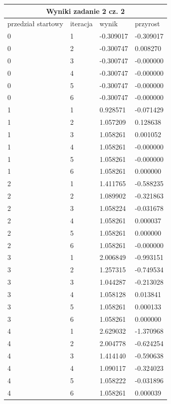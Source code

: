 \documentclass[a4paper, 11pt]{article}
\begin{document}
\begin{table}[H]
\centering
\label{my-label}
\begin{tabular}{|l|l|l|l|}
\hline
\multicolumn{4}{|c|}{\textbf{Wyniki zadanie 2 cz. 2}} \\ \hline
\multicolumn{1}{|c|}{przedział startowy} & iteracja & wynik & przyrost \\ \hline
0 & 1 & -0.309017 & -0.309017 \\ \hline
0 & 2 & -0.300747 & 0.008270 \\ \hline
0 & 3 & -0.300747 & -0.000000 \\ \hline
0 & 4 & -0.300747 & -0.000000 \\ \hline
0 & 5 & -0.300747 & -0.000000 \\ \hline
0 & 6 & -0.300747 & -0.000000 \\ \hline
1 & 1 & 0.928571 & -0.071429 \\ \hline
1 & 2 & 1.057209 & 0.128638 \\ \hline
1 & 3 & 1.058261 & 0.001052 \\ \hline
1 & 4 & 1.058261 & -0.000000 \\ \hline
1 & 5 & 1.058261 & -0.000000 \\ \hline
1 & 6 & 1.058261 & 0.000000 \\ \hline
2 & 1 & 1.411765 & -0.588235 \\ \hline
2 & 2 & 1.089902 & -0.321863 \\ \hline
2 & 3 & 1.058224 & -0.031678 \\ \hline
2 & 4 & 1.058261 & 0.000037 \\ \hline
2 & 5 & 1.058261 & 0.000000 \\ \hline
2 & 6 & 1.058261 & -0.000000 \\ \hline
3 & 1 & 2.006849 & -0.993151 \\ \hline
3 & 2 & 1.257315 & -0.749534 \\ \hline
3 & 3 & 1.044287 & -0.213028 \\ \hline
3 & 4 & 1.058128 & 0.013841 \\ \hline
3 & 5 & 1.058261 & 0.000133 \\ \hline
3 & 6 & 1.058261 & 0.000000 \\ \hline
4 & 1 & 2.629032 & -1.370968 \\ \hline
4 & 2 & 2.004778 & -0.624254 \\ \hline
4 & 3 & 1.414140 & -0.590638 \\ \hline
4 & 4 & 1.090117 & -0.324023 \\ \hline
4 & 5 & 1.058222 & -0.031896 \\ \hline
4 & 6 & 1.058261 & 0.000039 \\ \hline
\end{tabular}
\end{table}
\end{document}
